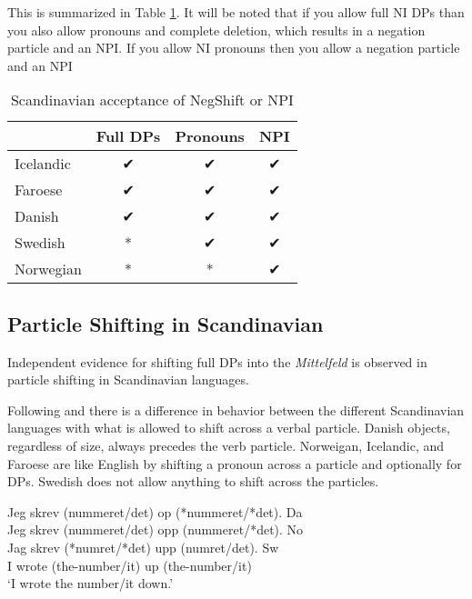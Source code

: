 \documentclass[12pt, letterpaper]{article}
\begin{document}
\ex This is summarized in Table \ref{tab:Paradigm}.
	\ea It will be noted that if you allow full NI DPs than you also allow pronouns and complete deletion, which results in a negation particle and an NPI.
	\ex If you allow NI pronouns then you allow a negation particle and an NPI
	\z 
\begin{table}[!ht]
	\centering
	\caption{Scandinavian acceptance of NegShift or NPI}
	\label{tab:Paradigm}
\begin{tabular}{lccc}
	\hline 
	& Full DPs & Pronouns & NPI\\
	\hline
	Icelandic & ✔︎ & ✔︎ & ✔︎ \\
	Faroese & ✔︎ & ✔︎ & ✔︎ \\
	Danish & ✔︎ & ✔︎ & ✔︎ \\
	Swedish & * & ✔︎ & ✔︎ \\
	Norwegian & * & * & ✔︎ \\
	\hline 
\end{tabular} 
\end{table}
\z 

\subsection{Particle Shifting in Scandinavian} \label{sec:HNPS}

\ea Independent evidence for shifting full DPs into the \emph{Mittelfeld} is observed in particle shifting in Scandinavian languages. 

\ex Following \citet[2]{holmbergRemarksHolmbergGeneralization1999} and \citet{faarlundSyntaxMainlandScandinavian2019} there is a difference in behavior between the different Scandinavian languages with what is allowed to shift across a verbal particle.
	\ea Danish objects, regardless of size, always precedes the verb particle. 
	\ex Norweigan, Icelandic, and Faroese are like English by shifting a pronoun across a particle and optionally for DPs.
	\ex Swedish does not allow anything to shift across the particles. 
	\z 

\ex \gllll Jeg skrev (nummeret/det) op (*nummeret/*det). \hfill Da\\
		Jeg skrev (nummeret/det) opp (nummeret/*det). \hfill No\\
		Jag skrev (*numret/*det) upp (numret/det). \hfill Sw\\
		I wrote (the-number/it) up (the-number/it)\\
\glt `I wrote the number/it down.'
\end{document}
